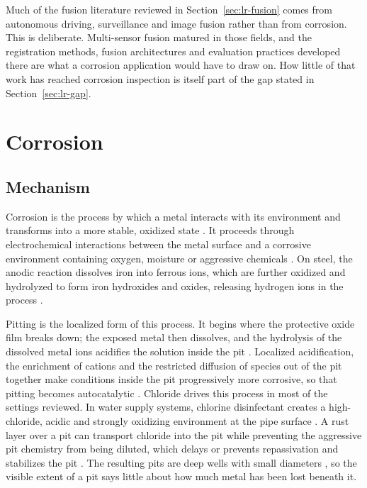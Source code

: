 Much of the fusion literature reviewed in Section~\ref{sec:lr-fusion} comes from
autonomous driving, surveillance and image fusion rather than from corrosion.
This is deliberate. Multi-sensor fusion matured in those fields, and the
registration methods, fusion architectures and evaluation practices developed
there are what a corrosion application would have to draw on. How little of that
work has reached corrosion inspection is itself part of the gap stated in
Section~\ref{sec:lr-gap}.

\section{Corrosion}
\label{sec:lr-corrosion}

\subsection{Mechanism}

Corrosion is the process by which a metal interacts with its environment and
transforms into a more stable, oxidized state \citep{Elizalde2023}. It proceeds through
electrochemical interactions between the metal surface and a corrosive
environment containing oxygen, moisture or aggressive chemicals \citep{Alvani2026}. On steel,
the anodic reaction dissolves iron into ferrous ions, which are further oxidized
and hydrolyzed to form iron hydroxides and oxides, releasing hydrogen ions in the
process \citep{Liu2026}.

Pitting is the localized form of this process. It begins where the protective
oxide film breaks down; the exposed metal then dissolves, and the hydrolysis of
the dissolved metal ions acidifies the solution inside the pit \citep{Liu2026}. Localized
acidification, the enrichment of cations and the restricted diffusion of species
out of the pit together make conditions inside the pit progressively more
corrosive, so that pitting becomes autocatalytic \citep{Liu2026}. Chloride drives this
process in most of the settings reviewed. In water supply systems, chlorine
disinfectant creates a high-chloride, acidic and strongly oxidizing environment
at the pipe surface \citep{Li2022}. A rust layer over a pit can transport chloride into
the pit while preventing the aggressive pit chemistry from being diluted, which
delays or prevents repassivation and stabilizes the pit \citep{Nguyen2026}. The resulting pits
are deep wells with small diameters \citep{Soares2023}, so the visible extent of a pit says
little about how much metal has been lost beneath it.

